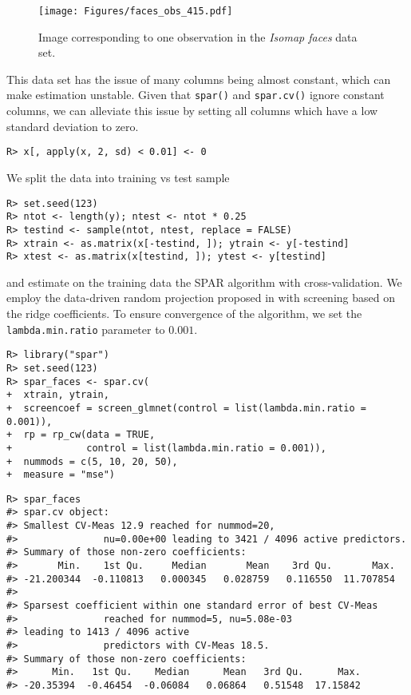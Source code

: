 \documentclass[
  article]{jss}
\begin{document}
\begin{figure}[t!]
\centering
\texttt{[image: Figures/faces\_obs\_415.pdf]}
\caption{Image corresponding to one observation in the \emph{Isomap faces} data set. \label{fig:facesplot1}}
\end{figure}

This data set has the issue of many columns being almost constant, which
can make estimation unstable. Given that \texttt{spar()} and
\texttt{spar.cv()} ignore constant columns, we can alleviate this issue
by setting all columns which have a low standard deviation to zero.

\begin{verbatim}
R> x[, apply(x, 2, sd) < 0.01] <- 0
\end{verbatim}

We split the data into training vs test sample

\begin{verbatim}
R> set.seed(123)
R> ntot <- length(y); ntest <- ntot * 0.25
R> testind <- sample(ntot, ntest, replace = FALSE)
R> xtrain <- as.matrix(x[-testind, ]); ytrain <- y[-testind]
R> xtest <- as.matrix(x[testind, ]); ytest <- y[testind]
\end{verbatim}

and estimate on the training data the SPAR algorithm with
cross-validation. We employ the data-driven random projection proposed
in \citet{parzer2024sparse} with screening based on the ridge
coefficients. To ensure convergence of the  algorithm, we
set the \texttt{lambda.min.ratio} parameter to \(0.001\).

\begin{verbatim}
R> library("spar")
R> set.seed(123)
R> spar_faces <- spar.cv(
+  xtrain, ytrain,
+  screencoef = screen_glmnet(control = list(lambda.min.ratio = 0.001)),
+  rp = rp_cw(data = TRUE, 
+             control = list(lambda.min.ratio = 0.001)),
+  nummods = c(5, 10, 20, 50),
+  measure = "mse")
\end{verbatim}

\begin{verbatim}
R> spar_faces
#> spar.cv object:
#> Smallest CV-Meas 12.9 reached for nummod=20,
#>               nu=0.00e+00 leading to 3421 / 4096 active predictors.
#> Summary of those non-zero coefficients:
#>       Min.    1st Qu.     Median       Mean    3rd Qu.       Max. 
#> -21.200344  -0.110813   0.000345   0.028759   0.116550  11.707854 
#> 
#> Sparsest coefficient within one standard error of best CV-Meas
#>               reached for nummod=5, nu=5.08e-03 
#> leading to 1413 / 4096 active
#>               predictors with CV-Meas 18.5.
#> Summary of those non-zero coefficients:
#>      Min.   1st Qu.    Median      Mean   3rd Qu.      Max. 
#> -20.35394  -0.46454  -0.06084   0.06864   0.51548  17.15842
\end{verbatim}
\end{document}
